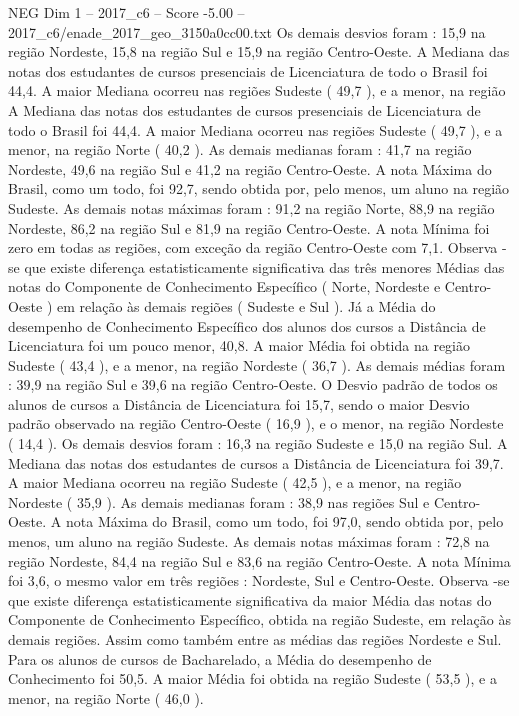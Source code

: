 \begin{textsample}{NEG Dim 1 – 2017\_c6 – Score -5.00 – 2017\_c6/enade\_2017\_geo\_3150a0cc00.txt}
Os demais desvios foram : 15,9 na região Nordeste, 15,8 na região Sul e 15,9 na região Centro-Oeste.
A Mediana das notas dos estudantes de cursos presenciais de Licenciatura de todo o Brasil foi 44,4.
A maior Mediana ocorreu nas regiões Sudeste ( 49,7 ), e a menor, na região A Mediana das notas dos estudantes de cursos presenciais de Licenciatura de todo o Brasil foi 44,4.
A maior Mediana ocorreu nas regiões Sudeste ( 49,7 ), e a menor, na região Norte ( 40,2 ).
As demais medianas foram : 41,7 na região Nordeste, 49,6 na região Sul e 41,2 na região Centro-Oeste.
A nota Máxima do Brasil, como um todo, foi 92,7, sendo obtida por, pelo menos, um aluno na região Sudeste.
As demais notas máximas foram : 91,2 na região Norte, 88,9 na região Nordeste, 86,2 na região Sul e 81,9 na região Centro-Oeste.
A nota Mínima foi zero em todas as regiões, com exceção da região Centro-Oeste com 7,1.
Observa -se que existe diferença estatisticamente significativa das três menores Médias das notas do Componente de Conhecimento Específico ( Norte, Nordeste e Centro-Oeste ) em relação às demais regiões ( Sudeste e Sul ).
Já a Média do desempenho de Conhecimento Específico dos alunos dos cursos a Distância de Licenciatura foi um pouco menor, 40,8.
A maior Média foi obtida na região Sudeste ( 43,4 ), e a menor, na região Nordeste ( 36,7 ).
As demais médias foram : 39,9 na região Sul e 39,6 na região Centro-Oeste.
O Desvio padrão de todos os alunos de cursos a Distância de Licenciatura foi 15,7, sendo o maior Desvio padrão observado na região Centro-Oeste ( 16,9 ), e o menor, na região Nordeste ( 14,4 ).
Os demais desvios foram : 16,3 na região Sudeste e 15,0 na região Sul.
A Mediana das notas dos estudantes de cursos a Distância de Licenciatura foi 39,7.
A maior Mediana ocorreu na região Sudeste ( 42,5 ), e a menor, na região Nordeste ( 35,9 ).
As demais medianas foram : 38,9 nas regiões Sul e Centro-Oeste.
A nota Máxima do Brasil, como um todo, foi 97,0, sendo obtida por, pelo menos, um aluno na região Sudeste.
As demais notas máximas foram : 72,8 na região Nordeste, 84,4 na região Sul e 83,6 na região Centro-Oeste.
A nota Mínima foi 3,6, o mesmo valor em três regiões : Nordeste, Sul e Centro-Oeste.
Observa -se que existe diferença estatisticamente significativa da maior Média das notas do Componente de Conhecimento Específico, obtida na região Sudeste, em relação às demais regiões.
Assim como também entre as médias das regiões Nordeste e Sul.
Para os alunos de cursos de Bacharelado, a Média do desempenho de Conhecimento foi 50,5.
A maior Média foi obtida na região Sudeste ( 53,5 ), e a menor, na região Norte ( 46,0 ).

\end{textsample}

